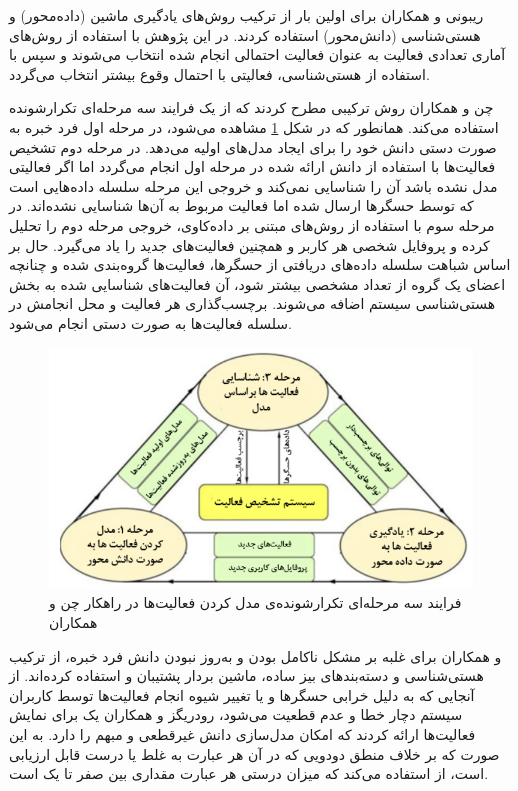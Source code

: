 ریبونی و همکاران \cite{x3231} برای اولین بار از ترکیب روش‌های یادگیری ماشین (داده‌محور) و هستی‌شناسی (دانش‌محور) استفاده کردند. در این پژوهش با استفاده از روش‌های آماری تعدادی فعالیت به عنوان فعالیت احتمالی انجام شده انتخاب می‌شوند و سپس با استفاده از هستی‌شناسی، فعالیتی با احتمال وقوع بیشتر انتخاب می‌گردد.

چن و همکاران \cite{x3232,x3233} روش ترکیبی مطرح کردند که از یک فرایند سه‌ مرحله‌ای تکرارشونده استفاده می‌کند. همانطور که در شکل \ref{fig:f31} مشاهده می‌شود، در مرحله اول فرد خبره به صورت دستی دانش خود را برای ایجاد مدل‌های اولیه می‌دهد. در مرحله دوم تشخیص فعالیت‌ها با استفاده از دانش ارائه شده در مرحله اول انجام می‌گردد اما اگر فعالیتی مدل‌ نشده باشد آن را شناسایی نمی‌کند و خروجی این مرحله سلسله داده‌هایی است که توسط حسگرها ارسال شده اما فعالیت مربوط به آن‌ها شناسایی نشده‌اند. در مرحله سوم با استفاده از روش‌های مبتنی بر داده‌کاوی، خروجی مرحله دوم را تحلیل کرده و پروفایل شخصی هر کاربر و همچنین فعالیت‌های جدید را یاد می‌گیرد. حال بر اساس شباهت سلسله داده‌های دریافتی از حسگرها، فعالیت‌ها گروه‌بندی شده و چنانچه اعضای یک گروه از تعداد مشخصی بیشتر شود، آن فعالیت‌های شناسایی شده به بخش هستی‌شناسی سیستم اضافه می‌شوند. برچسب‌گذاری هر فعالیت و محل انجامش در سلسله فعالیت‌ها به صورت دستی انجام می‌شود.

\begin{figure} [htp]
\centerline{\includegraphics [width=\textwidth] {figs/f31.png}}
\caption[فرایند سه مرحله‌ای تکرارشونده‌ی مدل کردن فعالیت‌ها در راهکار چن و همکاران]{فرایند سه مرحله‌ای تکرارشونده‌ی مدل کردن فعالیت‌ها در راهکار چن و همکاران \cite{x3223}}
\label{fig:f31}
\end{figure}

 و همکاران \cite{x3234} برای غلبه بر مشکل ناکامل بودن و به‌روز نبودن دانش فرد خبره، از ترکیب هستی‌شناسی و دسته‌بندهای بیز ساده، ماشین بردار پشتیبان و  استفاده کرده‌اند. از آنجایی که به دلیل خرابی حسگرها و یا تغییر شیوه انجام فعالیت‌ها توسط کاربران سیستم دچار خطا و عدم قطعیت می‌شود، رودریگز و همکاران \cite{x3228} یک  برای نمایش فعالیت‌ها ارائه کردند که امکان مدل‌سازی دانش غیرقطعی و مبهم را دارد. به این صورت که بر خلاف منطق دودویی که در آن هر عبارت به غلط یا درست قابل ارزیابی است، از  استفاده می‌کند که میزان درستی هر عبارت مقداری بین صفر تا یک است.

